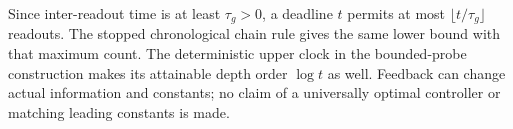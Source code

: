 Since inter-readout time is at least $\tau_g>0$, a deadline $t$ permits at
most $\lfloor t/\tau_g\rfloor$ readouts. The stopped chronological chain rule
gives the same lower bound with that maximum count. The deterministic upper
clock in the bounded-probe construction makes its attainable depth order
$\log t$ as well. Feedback can change actual information and constants; no
claim of a universally optimal controller or matching leading constants is made.
